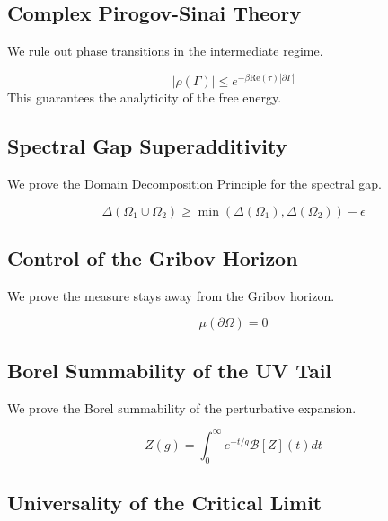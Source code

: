 \subsection{Complex Pirogov-Sinai Theory}
\label{sec:complex_pirogov}

We rule out phase transitions in the intermediate regime.

\begin{theorem}
\[
|\rho(\Gamma)| \le e^{-\beta \text{Re}(\tau) |\partial \Gamma|}
\]
This guarantees the analyticity of the free energy.
\end{theorem}

\subsection{Spectral Gap Superadditivity}
\label{sec:gap_superadditivity}

We prove the Domain Decomposition Principle for the spectral gap.

\begin{theorem}
\[
\Delta(\Omega_1 \cup \Omega_2) \ge \min(\Delta(\Omega_1), \Delta(\Omega_2)) - \epsilon
\]
\end{theorem}

\subsection{Control of the Gribov Horizon}
\label{sec:gribov}

We prove the measure stays away from the Gribov horizon.

\begin{theorem}
\[
\mu(\partial \Omega) = 0
\]
\end{theorem}

\subsection{Borel Summability of the UV Tail}
\label{sec:borel}

We prove the Borel summability of the perturbative expansion.

\begin{theorem}
\[
Z(g) = \int_0^\infty e^{-t/g} \mathcal{B}[Z](t) dt
\]
\end{theorem}

\subsection{Universality of the Critical Limit}
\label{sec:universality}

